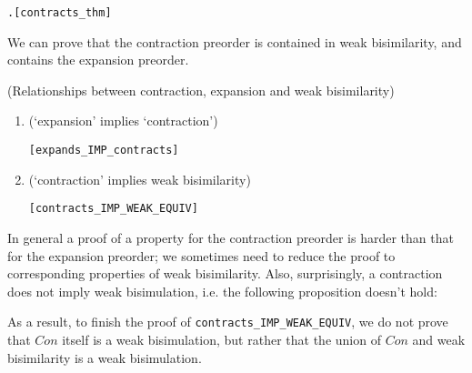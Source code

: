\begin{alltt}
\HOLTokenTurnstile{}  \HOLSymConst{\HOLTokenContracts{}}  \HOLSymConst{\HOLTokenEquiv{}} \HOLSymConst{\HOLTokenExists{}}.    \HOLSymConst{\HOLTokenConj{}}  \hfill{[contracts_thm]}
\end{alltt}

We can prove that the contraction preorder is contained in weak bisimilarity,
and contains the expansion preorder.
\begin{proposition}{(Relationships between contraction, expansion and weak
    bisimilarity)}
\begin{enumerate}
\item (`expansion' implies `contraction')
\begin{alltt}
\HOLTokenTurnstile{}  \HOLSymConst{\HOLTokenExpands{}}  \HOLSymConst{\HOLTokenImp{}}  \HOLSymConst{\HOLTokenContracts{}} \hfill[expands_IMP_contracts]
\end{alltt}
\item (`contraction' implies weak  bisimilarity)
\begin{alltt}
\HOLTokenTurnstile{}  \HOLSymConst{\HOLTokenContracts{}}  \HOLSymConst{\HOLTokenImp{}}  \HOLSymConst{\HOLTokenWeakEQ} \hfill[contracts_IMP_WEAK_EQUIV]
\end{alltt}
\end{enumerate}
\end{proposition}
In general a proof of a property for the  contraction preorder is
harder than that for the  expansion preorder; we sometimes need
to reduce the proof to corresponding properties of weak bisimilarity.
Also, surprisingly, a contraction does not imply weak bisimulation,
i.e. the following proposition doesn't hold:
\begin{alltt}
\end{alltt}
As a result, to finish the proof of \texttt{contracts_IMP_WEAK_EQUIV}, we do not prove
that $Con$ itself is a weak
   bisimulation, but rather that the union of  $Con$ and weak bisimilarity is a
   weak bisimulation.

